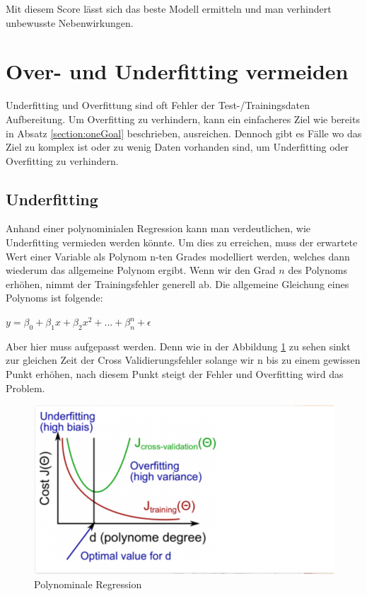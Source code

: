 \documentclass[12pt,oneside,a4paper,parskip]{scrbook}
\begin{document}
Mit diesem Score lässt sich das beste Modell ermitteln und man verhindert unbewusste Nebenwirkungen.

\section{Over- und Underfitting vermeiden}
\label{section:preventData}

Underfitting und Overfittung sind oft Fehler der Test-/Trainingsdaten Aufbereitung. Um Overfitting zu verhindern, kann ein einfacheres Ziel wie bereits in Absatz \ref{section:oneGoal} beschrieben, ausreichen. Dennoch gibt es Fälle wo das Ziel zu komplex ist oder zu wenig Daten vorhanden sind, um Underfitting oder Overfitting zu verhindern.

\subsection{Underfitting}

Anhand einer polynominialen Regression kann man verdeutlichen, wie Underfitting vermieden werden könnte. Um dies zu erreichen, muss der erwartete Wert einer Variable als Polynom n-ten Grades modelliert werden, welches dann wiederum das allgemeine Polynom ergibt. Wenn wir den Grad ${n}$ des Polynoms erhöhen, nimmt der Trainingsfehler generell ab. Die allgemeine Gleichung eines Polynoms ist folgende:

${\displaystyle y=\beta_{0}+\beta_{1}x+\beta_{2}x^{2}+...+\beta_{n}^n+\epsilon}$

Aber hier muss aufgepasst werden. Denn wie in der Abbildung \ref{fig:polyReg} zu sehen sinkt zur gleichen Zeit der Cross Validierungsfehler solange wir n bis zu einem gewissen Punkt erhöhen, nach diesem Punkt steigt der Fehler und Overfitting wird das Problem.

\begin{figure}[h]
	\begin{center}
		\includegraphics[width=15cm]{Bilder/polynomeRegression.png}
		\caption{Polynominale Regression}
		\label{fig:polyReg}
	\end{center}
\end{figure}
\end{document}
